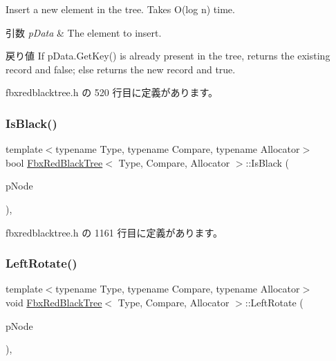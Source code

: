 Insert a new element in the tree. Takes O(log n) time. 
\begin{DoxyParams}{引数}
{\em p\+Data} & The element to insert. \\
\hline
\end{DoxyParams}
\begin{DoxyReturn}{戻り値}
If p\+Data.\+Get\+Key() is already present in the tree, returns the existing record and false; else returns the new record and true. 
\end{DoxyReturn}


 fbxredblacktree.\+h の 520 行目に定義があります。

\mbox{\label{class_fbx_red_black_tree_ab737a7f1323fcfce74268072f266ea28}} 
\subsubsection{\texorpdfstring{Is\+Black()}{IsBlack()}}
{\footnotesize\ttfamily template$<$typename Type, typename Compare, typename Allocator$>$ \\
bool \hyperlink{class_fbx_red_black_tree}{Fbx\+Red\+Black\+Tree}$<$ Type, Compare, Allocator $>$\+::Is\+Black (\begin{DoxyParamCaption}\item[{const \hyperlink{class_fbx_red_black_tree_1_1_record_type}{Record\+Type} $\ast$}]{p\+Node }\end{DoxyParamCaption})\hspace{0.3cm}{\ttfamily [inline]}, {\ttfamily [protected]}}



 fbxredblacktree.\+h の 1161 行目に定義があります。

\mbox{\label{class_fbx_red_black_tree_a91db157ad267d601b364522e823bb435}} 
\subsubsection{\texorpdfstring{Left\+Rotate()}{LeftRotate()}}
{\footnotesize\ttfamily template$<$typename Type, typename Compare, typename Allocator$>$ \\
void \hyperlink{class_fbx_red_black_tree}{Fbx\+Red\+Black\+Tree}$<$ Type, Compare, Allocator $>$\+::Left\+Rotate (\begin{DoxyParamCaption}\item[{\hyperlink{class_fbx_red_black_tree_1_1_record_type}{Record\+Type} $\ast$}]{p\+Node }\end{DoxyParamCaption})\hspace{0.3cm}{\ttfamily [inline]}, {\ttfamily [protected]}}



